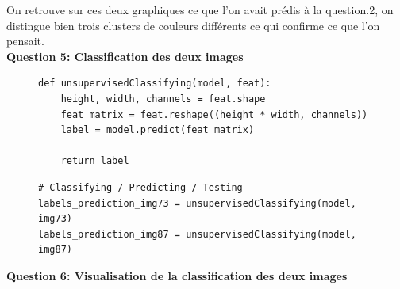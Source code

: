 On retrouve sur ces deux graphiques ce que l'on avait prédis à la question.2, on distingue bien trois clusters
de couleurs différents ce qui confirme ce que l'on pensait. \\


\textbf{Question 5: Classification des deux images}

\begin{figure}[!h]
    \begin{verbatim}
def unsupervisedClassifying(model, feat):
    height, width, channels = feat.shape
    feat_matrix = feat.reshape((height * width, channels))
    label = model.predict(feat_matrix)

    return label
    \end{verbatim}   
\end{figure}

\begin{figure}[!h]
    \begin{verbatim}
# Classifying / Predicting / Testing
labels_prediction_img73 = unsupervisedClassifying(model, img73)
labels_prediction_img87 = unsupervisedClassifying(model, img87)
    \end{verbatim}   
\end{figure}


\textbf{Question 6: Visualisation de la classification des deux images}


